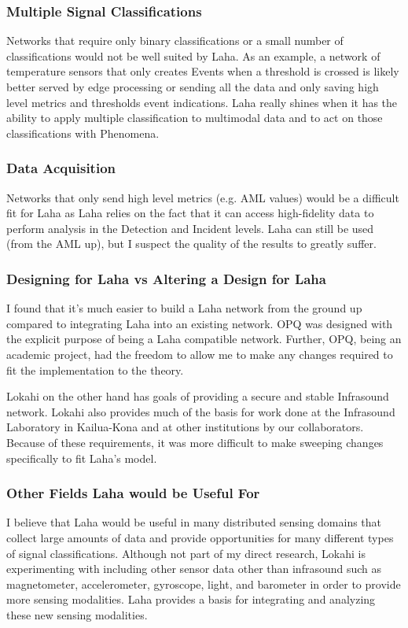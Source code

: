 \subsubsection{Multiple Signal Classifications}
Networks that require only binary classifications or a small number of classifications would not be well suited by Laha. As an example, a network of temperature sensors that only creates Events when a threshold is crossed is likely better served by edge processing or sending all the data and only saving high level metrics and thresholds event indications. Laha really shines when it has the ability to apply multiple classification to multimodal data and to act on those classifications with Phenomena.

\subsubsection{Data Acquisition}
Networks that only send high level metrics (e.g. AML values) would be a difficult fit for Laha as Laha relies on the fact that it can access high-fidelity data to perform analysis in the Detection and Incident levels. Laha can still be used (from the AML up), but I suspect the quality of the results to greatly suffer.

\subsubsection{Designing for Laha vs Altering a Design for Laha}
I found that it's much easier to build a Laha network from the ground up compared to integrating Laha into an existing network. OPQ was designed with the explicit purpose of being a Laha compatible network. Further, OPQ, being an academic project, had the freedom to allow me to make any changes required to fit the implementation to the theory.

Lokahi on the other hand has goals of providing a secure and stable Infrasound network. Lokahi also provides much of the basis for work done at the Infrasound Laboratory in Kailua-Kona and at other institutions by our collaborators. Because of these requirements, it was more difficult to make sweeping changes specifically to fit Laha's model.

\subsubsection{Other Fields Laha would be Useful For}
I believe that Laha would be useful in many distributed sensing domains that collect large amounts of data and provide opportunities for many different types of signal classifications. Although not part of my direct research, Lokahi is experimenting with including other sensor data other than infrasound such as magnetometer, accelerometer, gyroscope, light, and barometer in order to provide more sensing modalities. Laha provides a basis for integrating and analyzing these new sensing modalities.

